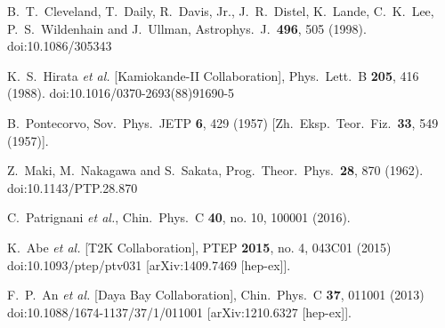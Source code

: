 \documentclass[a4 paper,12pt]{report}%
\begin{document}



\begin{thebibliography}{9}
  B.~T.~Cleveland, T.~Daily, R.~Davis, Jr., J.~R.~Distel, K.~Lande, C.~K.~Lee, P.~S.~Wildenhain and J.~Ullman,
  Astrophys.\ J.\  {\bf 496}, 505 (1998).
  doi:10.1086/305343

  K.~S.~Hirata {\it et al.} [Kamiokande-II Collaboration],
  Phys.\ Lett.\ B {\bf 205}, 416 (1988).
  doi:10.1016/0370-2693(88)91690-5

  B.~Pontecorvo,
  Sov.\ Phys.\ JETP {\bf 6}, 429 (1957)
  [Zh.\ Eksp.\ Teor.\ Fiz.\  {\bf 33}, 549 (1957)].


  Z.~Maki, M.~Nakagawa and S.~Sakata,
  Prog.\ Theor.\ Phys.\  {\bf 28}, 870 (1962).
  doi:10.1143/PTP.28.870
  
  C.~Patrignani {\it et al.},
  Chin.\ Phys.\ C {\bf 40}, no. 10, 100001 (2016).


  K.~Abe {\it et al.} [T2K Collaboration],
  PTEP {\bf 2015}, no. 4, 043C01 (2015)
  doi:10.1093/ptep/ptv031
  [arXiv:1409.7469 [hep-ex]].
  
  F.~P.~An {\it et al.} [Daya Bay Collaboration],
  Chin.\ Phys.\ C {\bf 37}, 011001 (2013)
  doi:10.1088/1674-1137/37/1/011001
  [arXiv:1210.6327 [hep-ex]].




\end{thebibliography}
\end{document}

